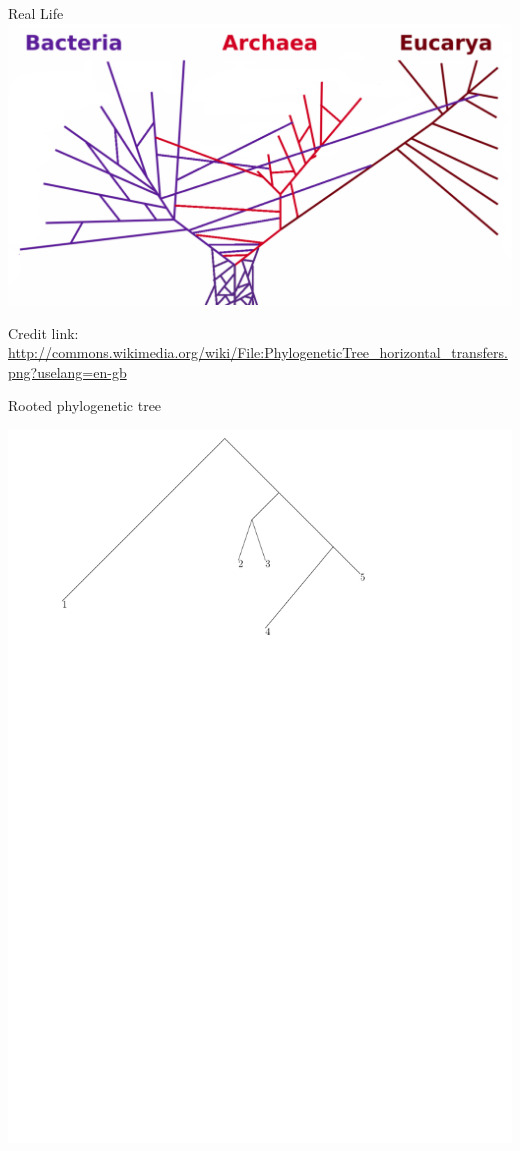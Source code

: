 \documentclass{beamer}
\begin{document}
\begin{frame}{Real Life}
\includegraphics[width=\framewidth]{realLife.pdf}

\vfill

\tiny
Credit link:
\href{http://commons.wikimedia.org/wiki/File:PhylogeneticTree_horizontal_transfers.png?uselang=en-gb}{http://commons.wikimedia.org/wiki/File:PhylogeneticTree\_horizontal\_transfers.png?uselang=en-gb}
\end{frame}

\begin{frame}{Rooted phylogenetic tree}
\begin{definition}
\includegraphics[width=\framewidth]{rooted}
\end{definition}
\end{frame}
\end{document}
